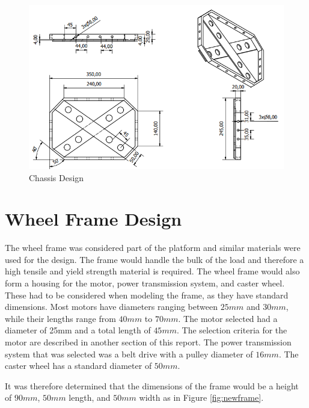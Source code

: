 \begin{figure}[H]
    \centering
    \includegraphics[scale = 0.8]{Figures/NewChassisDWG.png}
    \caption{Chassis Design}
    \label{fig:newchassis}
\end{figure}
{\sectionbreak}
\section{Wheel Frame Design}
The wheel frame was considered part of the platform and similar materials were used for the design. The frame would handle the bulk of the load and therefore a high tensile and yield strength material is required. The wheel frame would also form a housing for the motor, power transmission system, and caster wheel. These had to be considered when modeling the frame, as they have standard dimensions. Most motors have diameters ranging between $25 mm$ and $30 mm$, while their lengths range from $40 mm$ to $70 mm$. The motor selected had a diameter of 25mm and a total length of $45 mm$. The selection criteria for the motor are described in another section of this report. The power transmission system that was selected  was a belt drive with a pulley diameter of $16 mm$. The caster wheel has a standard diameter of $50  mm$.

It was therefore determined that the dimensions of the frame would be a height of $90 mm$, $50 mm$ length, and $50 mm$ width as in Figure \ref{fig:newframe}.

